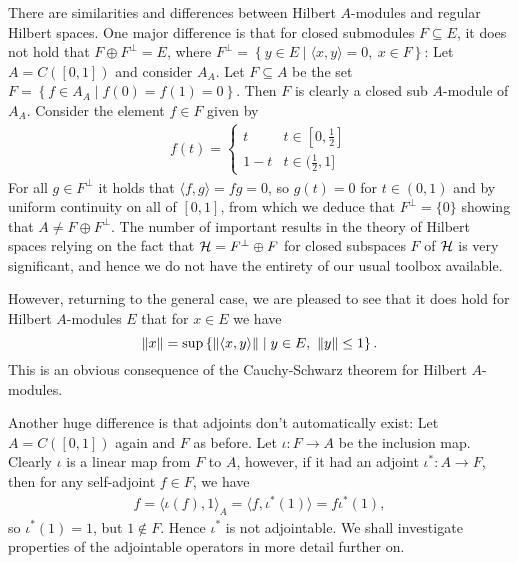 \begin{remark}
	There are similarities and differences between Hilbert $A$-modules and regular Hilbert spaces. One major difference is that for closed submodules $F\subseteq E$, it does not hold that $F \oplus F^\perp=E$, where $F^\perp = \left\{ y \in E \mid \langle x,y\rangle = 0, \ x \in F \right\}$: Let $A=C([0,1])$ and consider $A_A$. Let $F\subseteq A$ be the set $F = \left\{f \in A_A \mid f(0)=f(1)=0  \right\}$. Then $F$ is clearly a closed sub $A$-module of $A_A$. Consider the element $f \in F$ given by
	\begin{align*}
		f(t) = \begin{cases}
			t & t \in [0,\frac12]\\
		1-t & t \in (\frac12,1]
		\end{cases}
	\end{align*}
	For all $g \in F^\perp$ it holds that $\langle f,g\rangle = fg = 0$, so $g(t)=0$ for $t \in (0,1)$ and by uniform continuity on all of $[0,1]$, from which we deduce that $F^\perp = \{0\}$ showing that $A \neq F \oplus F^\perp$. The number of important results in the theory of Hilbert spaces relying on the fact that $\mathcal{H} =  F^\perp \oplus F$ for closed subspaces $F$ of $\mathcal{H}$ is very significant, and hence we do not have the entirety of our usual toolbox available. 

	However, returning to the general case, we are pleased to see that it does hold for Hilbert $A$-modules $E$ that for $x \in E$ we have
	\begin{equation}
		\left\lVert x \right\rVert = \sup\left\{ \left\lVert \langle x , y \rangle \right\rVert \mid y \in E, \ \left\lVert y \right\rVert \leq 1 \right\}. 
		\label{eq:0}
	\end{equation}
	This is an obvious consequence of the Cauchy-Schwarz theorem for Hilbert $A$-modules. 

	Another huge difference is that adjoints don't automatically exist: Let $A = C([0,1])$ again and $F$ as before. Let $ \iota \colon F \to A$ be the inclusion map. Clearly $\iota$ is a linear map from $F$ to $A$, however, if it had an adjoint $\iota^* \colon A \to F$, then for any self-adjoint $f \in F$, we have
	\begin{align*}
		 f = \langle \iota(f) , 1 \rangle_A = \langle f , \iota^*(1)\rangle = f \iota^*(1),
	\end{align*}
	so $\iota^*(1)=1$, but $1 \not\in F$. Hence $\iota^*$ is not adjointable. We shall investigate properties of the adjointable operators in more detail further on.
\end{remark}

